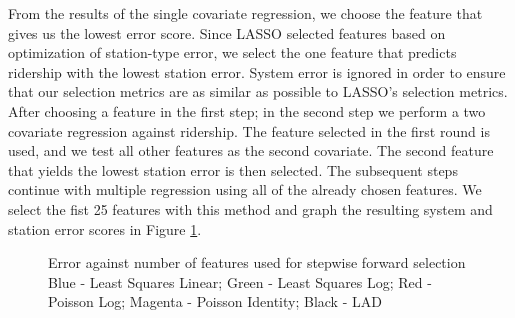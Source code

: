 \documentclass[11pt]{article}
\begin{document}
From the results of the single covariate regression, we choose the feature that gives us the lowest error score. Since LASSO selected features based on optimization of station-type error, we select the one feature that predicts ridership with the lowest station error. System error is ignored in order to ensure that our selection metrics are as similar as possible to LASSO's selection metrics. After choosing a feature in the first step; in the second step we perform a two covariate regression against ridership. The feature selected in the first round is used, and we test all other features as the second covariate. The second feature that yields the lowest station error is then selected. The subsequent steps continue with multiple regression using all of the already chosen features. We select the fist 25 features with this method and graph the resulting system and station error scores in Figure \ref{fig:bfscores}. 

\begin{figure}
\centering
{}
\captionsetup{singlelinecheck=off, font=scriptsize, justification=centering}
\caption[]{
Error against number of features used for stepwise forward selection\linebreak
Blue - Least Squares Linear; Green - Least Squares Log; Red - Poisson Log; Magenta - Poisson Identity; Black - LAD
}
\label{fig:bfscores}
\end{figure}
\end{document}
